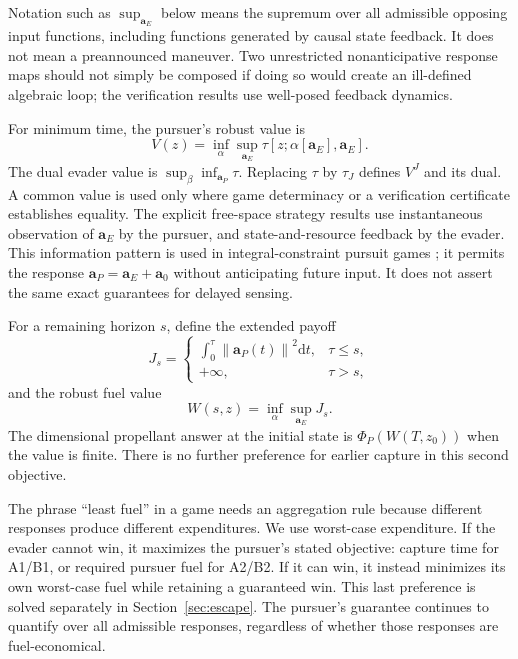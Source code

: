 \documentclass[journal,a4paper]{IEEEtran}
\newcommand{\norm}[1]{\left\|#1\right\|}
\newcommand{\dd}{\mathrm d}
\begin{document}
Notation such as $\sup_{\mathbf a_E}$ below means the supremum over all admissible opposing input functions, including functions generated by causal state feedback. It does not mean a preannounced maneuver. Two unrestricted nonanticipative response maps should not simply be composed if doing so would create an ill-defined algebraic loop; the verification results use well-posed feedback dynamics.

For minimum time, the pursuer's robust value is
\begin{equation}
 V(z)=\inf_\alpha\sup_{\mathbf a_E}
             \tau[z;\alpha[\mathbf a_E],\mathbf a_E].
 \label{eq:timevalue}
\end{equation}
The dual evader value is $\sup_\beta\inf_{\mathbf a_P}\tau$. Replacing $\tau$ by $\tau_J$ defines $V^J$ and its dual. A common value is used only where game determinacy or a verification certificate establishes equality. The explicit free-space strategy results use instantaneous observation of $\mathbf a_E$ by the pursuer, and state-and-resource feedback by the evader. This information pattern is used in integral-constraint pursuit games \cite{Ibragimov2011}; it permits the response $\mathbf a_P=\mathbf a_E+\mathbf a_0$ without anticipating future input. It does not assert the same exact guarantees for delayed sensing.

For a remaining horizon $s$, define the extended payoff
\begin{equation}
 J_s=
 \begin{cases}
 \displaystyle\int_0^\tau\norm{\mathbf a_P(t)}^2\dd t,
                                      &\tau\le s,\\
 +\infty,&\tau>s,
 \end{cases}
 \label{eq:Jfuel}
\end{equation}
and the robust fuel value
\begin{equation}
 W(s,z)=\inf_\alpha\sup_{\mathbf a_E}J_s.
 \label{eq:fuelvalue}
\end{equation}
The dimensional propellant answer at the initial state is $\Phi_P(W(T,z_0))$ when the value is finite. There is no further preference for earlier capture in this second objective.

The phrase ``least fuel'' in a game needs an aggregation rule because different responses produce different expenditures. We use worst-case expenditure. If the evader cannot win, it maximizes the pursuer's stated objective: capture time for A1/B1, or required pursuer fuel for A2/B2. If it can win, it instead minimizes its own worst-case fuel while retaining a guaranteed win. This last preference is solved separately in Section~\ref{sec:escape}. The pursuer's guarantee continues to quantify over all admissible responses, regardless of whether those responses are fuel-economical.
\end{document}
